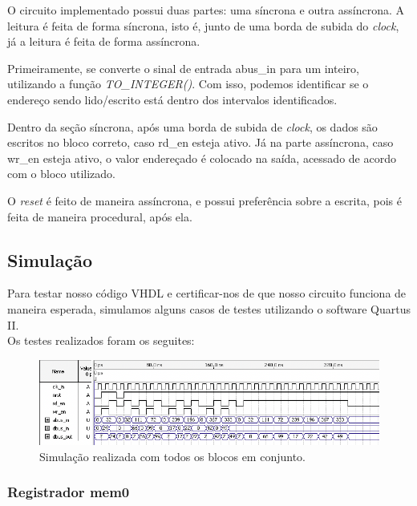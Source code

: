 \documentclass{article}
\begin{document}
O circuito implementado possui duas partes: uma síncrona e outra assíncrona. A leitura é feita de forma síncrona, isto é, junto de uma borda de subida do \textit{clock}, já a leitura é feita de forma assíncrona.

Primeiramente, se converte o sinal de entrada abus\_in para um inteiro, utilizando a função \textit{TO\_INTEGER()}. Com isso, podemos identificar se o endereço sendo lido/escrito está dentro dos intervalos identificados.

Dentro da seção síncrona, após uma borda de subida de \textit{clock}, os dados são escritos no bloco correto, caso rd\_en esteja ativo. Já na parte assíncrona, caso wr\_en esteja ativo, o valor endereçado é colocado na saída, acessado de acordo com o bloco utilizado.

O \textit{reset} é feito de maneira assíncrona, e possui preferência sobre a escrita, pois é feita de maneira procedural, após ela.

\subsection{Simulação}

Para testar nosso código VHDL e certificar-nos de que nosso circuito funciona de maneira esperada, simulamos alguns casos de testes utilizando o software Quartus II.\\

Os testes realizados foram os seguites:

\begin{figure}[ht]
\begin{center}
        \includegraphics[width=15cm]{images/ram-mem-all.png}
        \caption{Simulação realizada com todos os blocos em conjunto.}
\end{center}
\end{figure}

\subsubsection{Registrador mem0}
\end{document}
